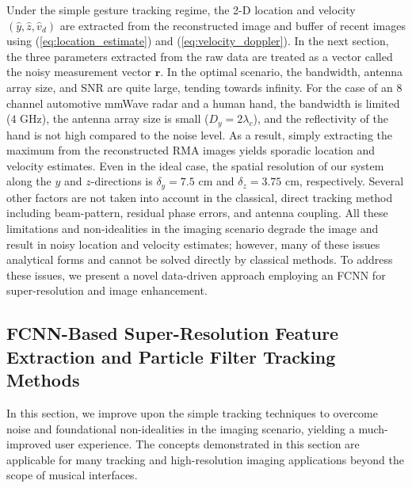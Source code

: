 \documentclass[10pt,journal,final]{IEEEtran}
\begin{document}
Under the simple gesture tracking regime, the 2-D location and velocity $(\hat{y},\hat{z},\hat{v}_d)$ are extracted from the reconstructed image and buffer of recent images using (\ref{eq:location_estimate}) and (\ref{eq:velocity_doppler}). 
In the next section, the three parameters extracted from the raw data are treated as a vector called the noisy measurement vector $\mathbf{r}$. 
In the optimal scenario, the bandwidth, antenna array size, and SNR are quite large, tending towards infinity.
For the case of an $8$ channel automotive mmWave radar and a human hand, the bandwidth is limited ($4$ GHz), the antenna array size is small ($D_y = 2\lambda_c$), and the reflectivity of the hand is not high compared to the noise level. 
As a result, simply extracting the maximum from the reconstructed RMA images yields sporadic location and velocity estimates. 
Even in the ideal case, the spatial resolution of our system along the $y$ and $z$-directions is $\delta_y = 7.5$ cm and $\delta_z = 3.75$ cm, respectively.
Several other factors are not taken into account in the classical, direct tracking method including beam-pattern, residual phase errors, and antenna coupling. 
All these limitations and non-idealities in the imaging scenario degrade the image and result in noisy location and velocity estimates; however, many of these issues analytical forms and cannot be solved directly by classical methods. 
To address these issues, we present a novel data-driven approach employing an FCNN for super-resolution and image enhancement. 

\subsection{FCNN-Based Super-Resolution Feature Extraction and Particle Filter Tracking Methods}
\label{subsec:enhanced_gesture_tracking}
In this section, we improve upon the simple tracking techniques to overcome noise and foundational non-idealities in the imaging scenario, yielding a much-improved user experience. 
The concepts demonstrated in this section are applicable for many tracking and high-resolution imaging applications beyond the scope of musical interfaces.
\end{document}
